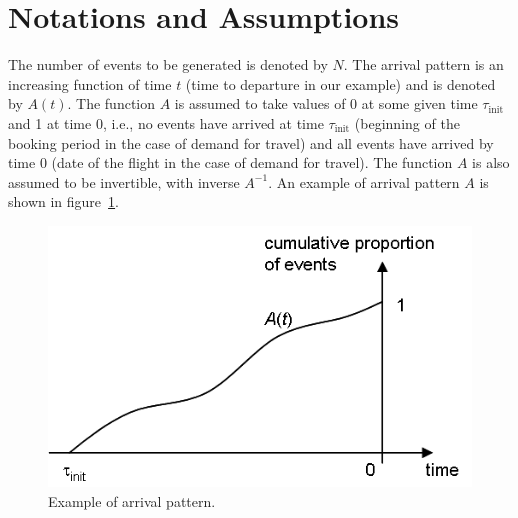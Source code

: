 \documentclass[12pt]{article} %
\begin{document}
\section{Notations and Assumptions}
%
The number of events to be generated is denoted by $N$. The arrival pattern is an increasing function of time $t$ (time to departure in our example) and is denoted by $A(t)$. The function $A$ is assumed to take values of 0 at some given time $\tau_\text{init}$ and 1 at time 0, i.e., no events have arrived at time $\tau_\text{init}$ (beginning of the booking period in the case of demand for travel) and all events have arrived by time 0 (date of the flight in the case of demand for travel). The function $A$ is also assumed to be invertible, with inverse $A^{-1}$. An example of arrival pattern $A$ is shown in figure~\ref{fig:arrivalPattern}.
\begin{figure}[h`!]
\centering
\includegraphics{arrivalPattern}
\vspace{-4mm}
\caption{Example of arrival pattern.}
\label{fig:arrivalPattern}
\end{figure}
%
%
\end{document}
